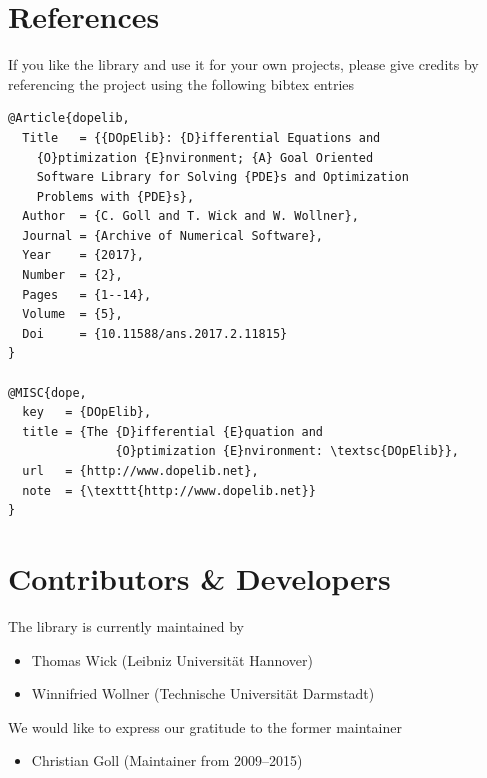 \newpage
\section{References}
If you like the library and use it for your own projects, please give credits by 
referencing the project \dope{} using the following bibtex entries \cite{dope,dopelib}

\begin{lstlisting}
@Article{dopelib,
  Title   = {{DOpElib}: {D}ifferential Equations and 
    {O}ptimization {E}nvironment; {A} Goal Oriented 
    Software Library for Solving {PDE}s and Optimization 
    Problems with {PDE}s},
  Author  = {C. Goll and T. Wick and W. Wollner},
  Journal = {Archive of Numerical Software},
  Year    = {2017},
  Number  = {2},
  Pages   = {1--14},
  Volume  = {5},
  Doi     = {10.11588/ans.2017.2.11815}
}

@MISC{dope,
  key   = {DOpElib},
  title = {The {D}ifferential {E}quation and 
               {O}ptimization {E}nvironment: \textsc{DOpElib}},
  url   = {http://www.dopelib.net},
  note  = {\texttt{http://www.dopelib.net}}
}
\end{lstlisting}


\section{Contributors \& Developers}
\label{sec:contrib}
The library is currently maintained by 
\begin{itemize}
  \item Thomas Wick (Leibniz Universit\"at Hannover)
  \item Winnifried Wollner (Technische Universität Darmstadt)
\end{itemize}

We would like to express our gratitude to the former maintainer
\begin{itemize}
\item Christian Goll (Maintainer from 2009--2015)
\end{itemize}

